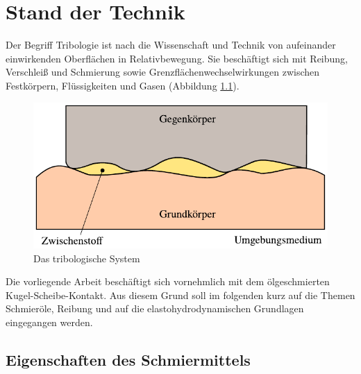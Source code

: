 \chapter{Stand der Technik}
\label{chap:stand_der_technik}

Der Begriff Tribologie ist nach \cite{bartz_2000} die Wissenschaft und Technik von aufeinander einwirkenden Oberflächen in Relativbewegung.
Sie beschäftigt sich mit Reibung, Verschleiß und Schmierung sowie Grenzflächenwechselwirkungen zwischen Festkörpern, Flüssigkeiten und Gasen (Abbildung \ref{fig:das_tribologische_system}).

\begin{figure}[htb]
    \centering
    \includegraphics[]{./images/tribologisches_system.pdf}
    \caption{Das tribologische System\cite{wisniewski_2000}}
    \label{fig:das_tribologische_system}
\end{figure}

Die vorliegende Arbeit beschäftigt sich vornehmlich mit dem ölgeschmierten Kugel-Scheibe-Kontakt.
Aus diesem Grund soll im folgenden kurz auf die Themen Schmieröle, Reibung und auf die elastohydrodynamischen Grundlagen eingegangen werden.

\section{Eigenschaften des Schmiermittels}
\label{sec:eigenschaften_des_schmiermittels}

